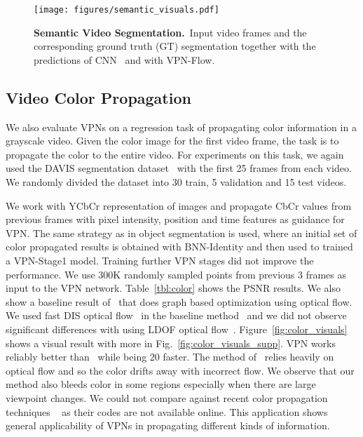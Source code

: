 \documentclass[10pt,twocolumn,letterpaper]{article}
\newcommand{\mycaption}[2]{\caption{\small \textbf{#1.}~#2}}
\begin{document}
\begin{figure}[th!]
  \vspace{-0.3cm}
\begin{center}
  \centerline{\texttt{[image: figures/semantic\_visuals.pdf]}}
    \mycaption{Semantic Video Segmentation}
    {Input video frames and the corresponding ground truth (GT)
    segmentation together with the predictions of CNN~\cite{yu2015multi} and with
    VPN-Flow.}
    \label{fig:semantic_visuals}
\end{center}
\vspace{-0.7cm}
\end{figure}

\vspace{-0.4cm}
\subsection{Video Color Propagation}

We also evaluate VPNs on a regression task of propagating color information in a grayscale video.
Given the color image for the first video frame, the task is to propagate the color to the entire
video.
For experiments on this task, we again used the DAVIS segmentation dataset~\cite{Perazzi2016} with the
first 25 frames from each video. We randomly divided the dataset into 30 train,
5 validation and 15 test videos.

We work with YCbCr representation of images and propagate CbCr values from previous
frames with pixel intensity, position and time features as guidance for VPN.
The same strategy as in object segmentation is used, where an initial
set of color propagated results is obtained with BNN-Identity and then used to trained a VPN-Stage1 model.
Training further VPN stages did not improve the performance.
We use 300K randomly sampled points from previous 3 frames as input
to the VPN network. Table~\ref{tbl:color} shows the PSNR results.
We also show a baseline result of~\cite{levin2004colorization} that
does graph based optimization using optical flow. We used fast
DIS optical flow~\cite{kroeger2016fast} in the baseline method~\cite{levin2004colorization}
and we did not observe significant differences with using LDOF optical flow~\cite{brox2009large}.
Figure~\ref{fig:color_visuals} shows a visual result with more
in Fig.~\ref{fig:color_visuals_supp}.
VPN works reliably better than~\cite{levin2004colorization} while being 20 faster.
The method of~\cite{levin2004colorization} relies heavily on optical flow
and so the color drifts away with incorrect flow. We observe that our method also bleeds color
in some regions especially when there are large viewpoint changes.
We could not compare against recent color propagation techniques
~\cite{heu2009image,sheng2014video} as their codes are not available online.
This application shows general applicability of VPNs in propagating different
kinds of information.
\end{document}
